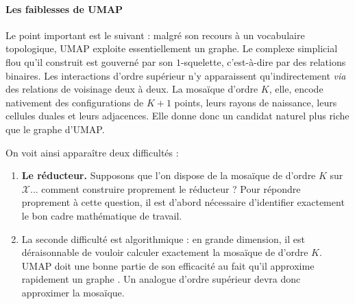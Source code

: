 \paragraph{Les faiblesses de UMAP}
Le point important est le suivant : malgré son recours à un vocabulaire topologique, UMAP exploite essentiellement un graphe. Le complexe simplicial flou qu'il construit est gouverné par son $1$-squelette, c'est-à-dire par des relations binaires. Les interactions d'ordre supérieur n'y apparaissent qu'indirectement \emph{via} des relations de voisinage deux à deux. La mosaïque d'ordre $K$, elle, encode nativement des configurations de $K+1$ points, leurs rayons de naissance, leurs cellules duales et leurs adjacences. Elle donne donc un candidat naturel plus riche que le graphe d'UMAP.


On voit ainsi apparaître deux difficultés :
\begin{enumerate}
    \item \textbf{Le réducteur.} Supposons que l'on dispose de la mosaïque de  d'ordre $K$ sur $\mathcal X$... comment construire proprement le réducteur ? Pour répondre proprement à cette question, il est d'abord nécessaire d'identifier exactement le bon cadre mathématique de travail.
    \item La seconde difficulté est algorithmique : en grande dimension, il est déraisonnable de vouloir calculer exactement la mosaïque de  d'ordre $K$. UMAP doit une bonne partie de son efficacité au fait qu'il approxime rapidement un graphe \KNN.
    Un analogue d'ordre supérieur devra donc approximer la mosaïque. 
\end{enumerate}





